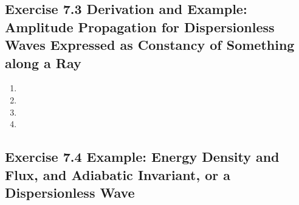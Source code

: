 \documentclass[10pt,a4paper]{book}
\theoremstyle{definition}
\begin{document}
\subsection{Exercise 7.3 Derivation and Example: Amplitude Propagation for Dispersionless Waves Expressed as Constancy of Something along a Ray}
\begin{enumerate}[label=(\alph*)]
\item
\item
\item
\item
\end{enumerate}

\subsection{Exercise 7.4 Example: Energy Density and Flux, and Adiabatic Invariant, or a Dispersionless Wave}
\end{document}
